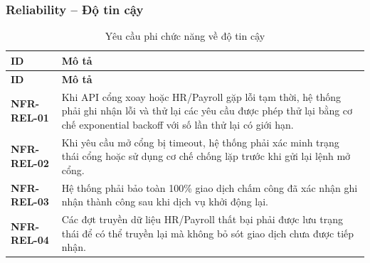 \subsubsection{Reliability -- Độ tin cậy}
\begingroup
\small
\renewcommand{\arraystretch}{1.2}
\begin{longtable}{|>{\centering\arraybackslash}m{3cm}|>{\raggedright\arraybackslash}m{12.9cm}|}
    \caption{Yêu cầu phi chức năng về độ tin cậy}\label{tab:nfr-reliability}\\
    \hline
    \textbf{ID} & \textbf{Mô tả}\\
    \hline
    \endfirsthead
    \hline
    \textbf{ID} & \textbf{Mô tả}\\
    \hline
    \endhead
    \hline
    \endfoot
    \hline
    \endlastfoot
    \textbf{NFR-REL-01} & Khi API cổng xoay hoặc HR/Payroll gặp lỗi tạm thời, hệ thống phải ghi nhận lỗi và thử lại các yêu cầu được phép thử lại bằng cơ chế exponential backoff với số lần thử lại có giới hạn.\\
    \hline
    \textbf{NFR-REL-02} & Khi yêu cầu mở cổng bị timeout, hệ thống phải xác minh trạng thái cổng hoặc sử dụng cơ chế chống lặp trước khi gửi lại lệnh mở cổng.\\
    \hline
    \textbf{NFR-REL-03} & Hệ thống phải bảo toàn 100\% giao dịch chấm công đã xác nhận ghi nhận thành công sau khi dịch vụ khởi động lại.\\
    \hline
    \textbf{NFR-REL-04} & Các đợt truyền dữ liệu HR/Payroll thất bại phải được lưu trạng thái để có thể truyền lại mà không bỏ sót giao dịch chưa được tiếp nhận.\\
    \hline
\end{longtable}
\endgroup

